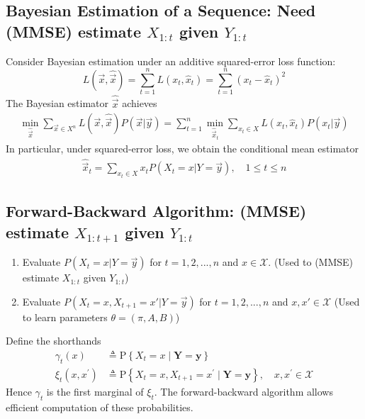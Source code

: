 \documentclass[11pt,a4paper]{article}
\begin{document}
\subsection{Bayesian Estimation of a Sequence: Need (MMSE) estimate $X_{1:t}$ given $Y_{1:t}$}
Consider Bayesian estimation under an additive squared-error loss function: $$L(\vec{x},\hat{\vec{x}})=\sum_{t=1}^nL(x_t,\hat{x}_t)=\sum_{t=1}^n\left(x_t-\hat{x}_t\right)^2$$
The Bayesian estimator $\hat{\vec{x}}$ achieves
\begin{equation}
    \begin{aligned}
        \min_{\hat{\vec{x}}}\sum_{\vec{x}\in X^n}L(\vec{x},\hat{\vec{x}})P(\vec{x}|\vec{y})=\sum_{t=1}^n\min_{\hat{\vec{x}}_t}\sum_{x_t\in X}L(x_t,\hat{x}_t)P(x_t|\vec{y})
    \end{aligned}
    \nonumber
\end{equation}
In particular, under squared-error loss, we obtain the conditional mean estimator
\begin{equation}
    \begin{aligned}
        \hat{\vec{x}}_t=\sum_{x_t\in X}x_t P\left(X_t=x|Y=\vec{y}\right),\quad 1\leq t\leq n
    \end{aligned}
    \nonumber
\end{equation}

\subsection{Forward-Backward Algorithm: (MMSE) estimate $X_{1:t+1}$ given $Y_{1:t}$}
\begin{enumerate}
    \item Evaluate $P\left(X_t=x|Y=\vec{y}\right)$ for $t=1,2,...,n$ and $x\in \mathcal{X}$. (Used to (MMSE) estimate $X_{1:t}$ given $Y_{1:t}$)
    \item Evaluate $P\left(X_t=x,X_{t+1}=x'|Y=\vec{y}\right)$ for $t=1,2,...,n$ and $x,x'\in \mathcal{X}$ (Used to learn parameters $\theta=(\pi,A,B)$)
\end{enumerate}
Define the shorthands
$$
\begin{aligned}
\gamma_t(x) & \triangleq \mathrm{P}\left\{X_t=x \mid \boldsymbol{Y}=\boldsymbol{y}\right\} \\
\xi_t\left(x, x^{\prime}\right) & \triangleq \mathrm{P}\left\{X_t=x, X_{t+1}=x^{\prime} \mid \boldsymbol{Y}=\boldsymbol{y}\right\}, \quad x, x^{\prime} \in \mathcal{X}
\end{aligned}
$$
Hence $\gamma_t$ is the first marginal of $\xi_t$. The forward-backward algorithm allows efficient computation of these probabilities.
\end{document}
